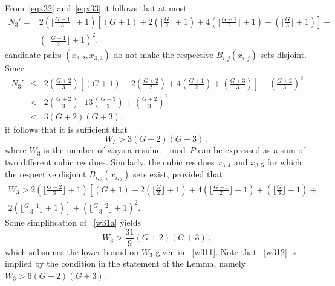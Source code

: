From~\eqref{eqx32} and~\eqref{eqx33} it follows that at most
\begin{equation}\label{w31}\begin{array}{lll} N_3'=&2 \left( \lfloor \frac{G-1}{3}\rfloor +1\right) \left[
(G+1)+2\left( \lfloor \frac{G}{2}\rfloor +1\right) +4\left( \lfloor
\frac{G-1}{2}\rfloor +1\right) + \left( \lfloor \frac{G}{3}\rfloor
+1\right)\right]+ \\{}&\left( \lfloor \frac{G-1}{3}\rfloor
+1\right)^2.
\end{array}\end{equation}
candidate pairs $(x_{3,2},x_{3,3})$ do not make the respective
$B_{i,j}(x_{i,j})$ sets disjoint. Since
\begin{equation}\label{w31a}\begin{array}{lll}
N_3'& \leq &2\left( \frac{G+2}{3} \right) \left[ (G+1)+2\left(
\frac{G+2}{2}\right) +4\left( \frac{G+1}{2}\right) + \left(
\frac{G+3}{3}\right)\right]+\left(  \frac{G+2}{3}
\right)^2\\
{}&<&2\left( \frac{G+2}{3} \right) \cdot
13\left(\frac{G+3}{3}\right)+\left( \frac{G+2}{3} \right)^2\\
{}&<&3(G+2)(G+3),
\end{array}\end{equation} it follows that it is sufficient that
\begin{equation}\label{w311}
W_3 > 3 (G+2)(G+3)~,
\end{equation}
where $W_3$ is the number of ways a residue $\mod P$ can be
expressed as a sum of two different cubic residues. Similarly, the
cubic residues $x_{3,4}$ and $x_{3,5}$ for which the respective
disjoint $B_{i,j}(x_{i,j})$ sets  exist, provided that
\begin{equation}\label{w31a}\begin{array}{lll} W_3
> 2 \left( \lfloor \frac{G-2}{3}\rfloor +1\right)\left[
(G+1)+2\left( \lfloor \frac{G}{2}\rfloor +1\right) +4\left( \lfloor
\frac{G-1}{2}\rfloor +1\right)  +\left( \lfloor \frac{G}{3}\rfloor
+1\right)+\right.\\\left.2\left( \lfloor \frac{G-1}{3}\rfloor
+1\right)\right]+ \left( \lfloor \frac{G-2}{3}\rfloor +1\right)^2.
\end{array}\end{equation}
 Some simplification of ~\eqref{w31a} yields
\begin{equation}\label{w312}
W_3 > \frac{31}{9} (G+2)(G+3)~,
\end{equation}
which subsumes the lower bound on $W_3$ given in ~\eqref{w311}. Note
that ~\eqref{w312} is implied by the condition in the statement of
the Lemma, namely $W_3 >6(G+2)(G+3)$.

